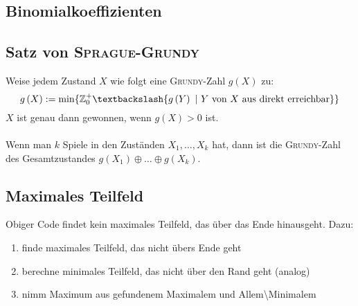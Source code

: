 \subsection{Binomialkoeffizienten}


\subsection{Satz von \textsc{Sprague-Grundy}}
Weise jedem Zustand $X$ wie folgt eine \textsc{Grundy}-Zahl $g\left(X\right)$ zu:
\[
	g\left(X\right) := \min\{ \mathbb{Z}_0^+ \textbackslash \{g\left(Y\right)~|~Y \text{ von } X \text{ aus direkt erreichbar}\}\} 
\]
$X$ ist genau dann gewonnen, wenn $g\left(X\right) > 0$ ist.\\\\
Wenn man $k$ Spiele in den Zuständen $X_1, \ldots, X_k$ hat, dann ist die \textsc{Grundy}-Zahl des Gesamtzustandes $g\left(X_1\right) \oplus \ldots \oplus g\left(X_k\right)$.

\subsection{Maximales Teilfeld}

Obiger Code findet kein maximales Teilfeld, das über das Ende hinausgeht. Dazu:
\begin{enumerate}
	\item finde maximales Teilfeld, das nicht übers Ende geht
	\item berechne minimales Teilfeld, das nicht über den Rand geht (analog)
	\item nimm Maximum aus gefundenem Maximalem und Allem\textbackslash Minimalem
\end{enumerate}

